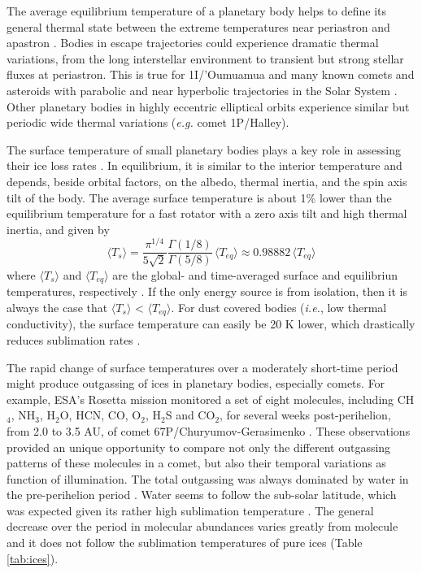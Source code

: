 \documentclass[a4paper,fleqn,usenatbib]{mnras}
\begin{document}

The average equilibrium temperature of a planetary body helps to define its general thermal state between the extreme temperatures near periastron and apastron \citep{2017ApJ...837L...1M}. Bodies in escape trajectories could experience dramatic thermal variations, from the long interstellar environment to transient but strong stellar fluxes at periastron. This is true for 1I/'Oumuamua and many known comets and asteroids with parabolic and near hyperbolic trajectories in the Solar System \citep{SSD(2018)}. Other planetary bodies in highly eccentric elliptical orbits experience similar but periodic wide thermal variations (\emph{e.g.} comet 1P/Halley).


The surface temperature of small planetary bodies plays a key role in assessing their ice loss rates \citep{2018arXiv180201293S}. In equilibrium, it is similar to the interior temperature and depends, beside orbital factors, on the albedo, thermal inertia, and the spin axis tilt of the body. The average surface temperature is about 1\% lower than the equilibrium temperature for a fast rotator with a zero axis tilt and high thermal inertia, and given by
\begin{equation} \label{eq:Ts}
\langle T_s \rangle = \frac{\pi^{1/4}}{5\sqrt{2}} \frac{\Gamma(1/8)}{\Gamma(5/8)} \, \langle T_{eq} \rangle \approx 0.98882 \, \langle T_{eq} \rangle
\end{equation}
where $\langle T_s \rangle$ and $\langle T_{eq} \rangle$ are the global- and time-averaged surface and equilibriun temperatures, respectively \citep{2018arXiv180201293S}. If the only energy source is from isolation, then it is
always the case that $\langle T_s \rangle$ < $\langle T_{eq} \rangle$. For dust covered bodies (\emph{i.e.}, low thermal conductivity), the surface temperature
can easily be 20 K lower, which drastically reduces sublimation rates \citep{2008ApJ...682..697S, 2016Icar..276...88S}.


The rapid change of surface temperatures over a moderately short-time period might produce outgassing of ices in planetary bodies, especially comets. For example, ESA's Rosetta mission monitored a set of eight molecules, including CH$_4$, NH$_3$, H$_2$O, HCN, CO, O$_2$, H$_2$S and CO$_2$, for several weeks post-perihelion, from 2.0 to 3.5 AU, of comet 67P/Churyumov-Gerasimenko \citep{2017MNRAS.469S.108G}. These observations provided an unique opportunity to compare not only the different outgassing patterns of these molecules in a comet, but also their temporal variations as function of illumination. The total outgassing was always dominated by water in the pre-perihelion period \citep{2016MNRAS.462S.156F}. Water seems to follow the sub-solar latitude, which was expected given its rather high sublimation temperature \citep{2016MNRAS.462S.491H}. The general decrease over the period in molecular abundances varies greatly from molecule and it does not follow the sublimation temperatures of pure ices (Table \ref{tab:ices}).
\end{document}
